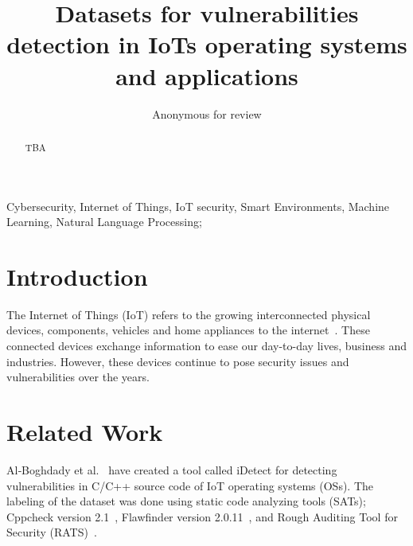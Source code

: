 \documentclass[conference]{IEEEtran}
\begin{document}
%
\title{Datasets for vulnerabilities detection in IoTs operating systems and applications}

\author{
    Anonymous for review
}

\IEEEoverridecommandlockouts


\maketitle  

\IEEEpubidadjcol

\begin{abstract}
TBA
\end{abstract}

\begin{IEEEkeywords}
Cybersecurity, Internet of Things, IoT security, Smart Environments, 
Machine Learning, Natural Language Processing;
\end{IEEEkeywords}


\section{Introduction}

The Internet of Things (IoT) refers to the growing interconnected physical devices, 
components, vehicles and home appliances to the internet~\cite{oracle2023:what}.
These connected devices exchange information to ease our day-to-day lives, business and industries. 
However, these devices continue to pose security issues and vulnerabilities over the years. 



\section{Related Work}

Al‑Boghdady et al.~\cite{al-boghdady2022:idetect} have created a tool called iDetect for detecting 
vulnerabilities in C/C++ source code of IoT operating systems (OSs). 
The labeling of the dataset was done using static code analyzing tools (SATs);
Cppcheck version 2.1~\cite{cppcheck2.12021:tool}, 
Flawfinder version 2.0.11~\cite{dwheeler2021:flawfinder}, 
and Rough Auditing Tool for Security (RATS)~\cite{rats2021:rough}.
\end{document}
